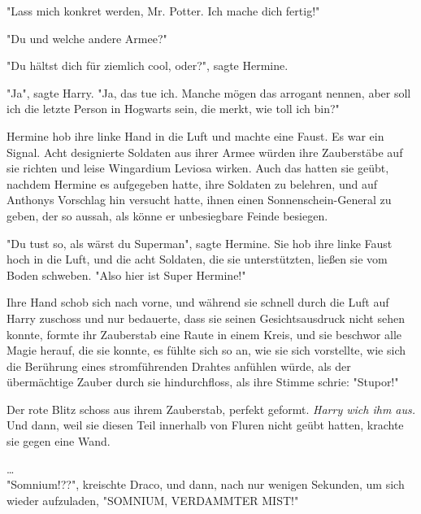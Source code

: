 {"Lass mich konkret werden, Mr. Potter. Ich mache dich fertig!"

"Du und welche andere Armee?"

"Du hältst dich für ziemlich cool, oder?", sagte Hermine.

"Ja", sagte Harry. "Ja, das tue ich. Manche mögen das arrogant nennen, aber soll ich die letzte Person in Hogwarts sein, die merkt, wie toll ich bin?"

Hermine hob ihre linke Hand in die Luft und machte eine Faust. Es war ein Signal. Acht designierte Soldaten aus ihrer Armee würden ihre Zauberstäbe auf sie richten und leise Wingardium Leviosa wirken. Auch das hatten sie geübt, nachdem Hermine es aufgegeben hatte, ihre Soldaten zu belehren, und auf Anthonys Vorschlag hin versucht hatte, ihnen einen Sonnenschein-General zu geben, der so aussah, als könne er unbesiegbare Feinde besiegen.

"Du tust so, als wärst du Superman", sagte Hermine. Sie hob ihre linke Faust hoch in die Luft, und die acht Soldaten, die sie unterstützten, ließen sie vom Boden schweben. "Also hier ist Super Hermine!"

Ihre Hand schob sich nach vorne, und während sie schnell durch die Luft auf Harry zuschoss und nur bedauerte, dass sie seinen Gesichtsausdruck nicht sehen konnte, formte ihr Zauberstab eine Raute in einem Kreis, und sie beschwor alle Magie herauf, die sie konnte, es fühlte sich so an, wie sie sich vorstellte, wie sich die Berührung eines stromführenden Drahtes anfühlen würde, als der übermächtige Zauber durch sie hindurchfloss, als ihre Stimme schrie: "Stupor!"

Der rote Blitz schoss aus ihrem Zauberstab, perfekt geformt. \emph{Harry wich ihm aus.} Und dann, weil sie diesen Teil innerhalb von Fluren nicht geübt hatten, krachte sie gegen eine Wand.

…\\ "Somnium!??", kreischte Draco, und dann, nach nur wenigen Sekunden, um sich wieder aufzuladen, "SOMNIUM, VERDAMMTER MIST!"

}
